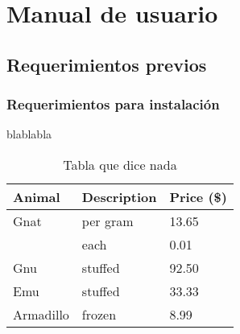 
\chapter{Manual de usuario}
\label{cap:manual}


\section{Requerimientos previos}

\subsection{Requerimientos para instalación}
blablabla

\begin{table}[ht]
\caption{Tabla que dice nada}\label{tab:nombreTablaReferenciable}
\small %
\centering
\begin{tabular}{lll}
Animal    & Description & Price (\$) \\
\hline
Gnat      & per gram    & 13.65      \\
          & each        & 0.01       \\
Gnu       & stuffed     & 92.50      \\
Emu       & stuffed     & 33.33      \\
Armadillo & frozen      & 8.99       \\
\hline
\end{tabular}
\end{table}
